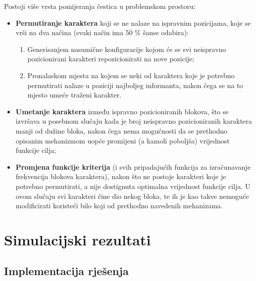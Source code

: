 \documentclass[12pt, a4paper]{article}
\begin{document}
Postoji više vrsta pomijeranja čestica u problemskom prostoru: \\

\begin{itemize}
\renewcommand\labelitemi{--}

\item \textbf{Permutiranje karaktera} koji se ne nalaze na ispravnim pozicijama, koje se vrši na dva načina (svaki način ima 50 \% šanse odabira):

\begin{enumerate}

\item Generisanjem nasumične konfiguracije kojom će se svi neispravno pozicionirani karakteri repozicionirati na nove pozicije;

\item Pronalaskom mjesta na kojem se neki od karaktera koje je potrebno permutirati nalaze u poziciji najboljeg informanta, nakon čega se na to mjesto umeće traženi karakter.

\end{enumerate}

\item \textbf{Umetanje karaktera} između ispravno pozicioniranih blokova, što se izvršava u posebnom slučaju kada je broj neispravno pozicioniranih karaktera manji od dužine bloka, nakon čega nema mogućnosti da se prethodno opisanim mehanizmom uopće promijeni (a kamoli poboljša) vrijednost funkcije cilja;

\item \textbf{Promjena funkcije kriterija} (i svih pripadajućih funkcija za izračunavanje frekvencija blokova karaktera), nakon što ne postoje karakteri koje je potrebno permutirati, a nije dostignuta optimalna vrijednost funkcije cilja. U ovom slučaju svi karakteri čine dio nekog bloka, te ih je kao takve nemoguće modificirati koristeći bilo koji od prethodno navedenih mehanizama.

\end{itemize}

\newpage

\section{Simulacijski rezultati}

\subsection{Implementacija rješenja}
\end{document}
